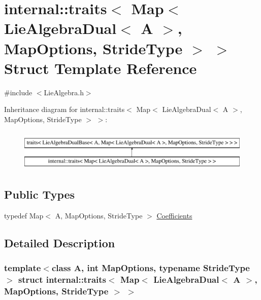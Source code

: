 \hypertarget{structinternal_1_1traits_3_01_map_3_01_lie_algebra_dual_3_01_a_01_4_00_01_map_options_00_01_stride_type_01_4_01_4}{}\section{internal\+:\+:traits$<$ Map$<$ Lie\+Algebra\+Dual$<$ A $>$, Map\+Options, Stride\+Type $>$ $>$ Struct Template Reference}
\label{structinternal_1_1traits_3_01_map_3_01_lie_algebra_dual_3_01_a_01_4_00_01_map_options_00_01_stride_type_01_4_01_4}


{\ttfamily \#include $<$Lie\+Algebra.\+h$>$}

Inheritance diagram for internal\+:\+:traits$<$ Map$<$ Lie\+Algebra\+Dual$<$ A $>$, Map\+Options, Stride\+Type $>$ $>$\+:\begin{figure}[H]
\begin{center}
\leavevmode
\includegraphics[height=2.000000cm]{structinternal_1_1traits_3_01_map_3_01_lie_algebra_dual_3_01_a_01_4_00_01_map_options_00_01_stride_type_01_4_01_4}
\end{center}
\end{figure}
\subsection*{Public Types}
\begin{DoxyCompactItemize}
\item 
typedef Map$<$ A, Map\+Options, Stride\+Type $>$ \hyperlink{structinternal_1_1traits_3_01_map_3_01_lie_algebra_dual_3_01_a_01_4_00_01_map_options_00_01_stride_type_01_4_01_4_ac32d899dac63614bee761abd9fd3241d}{Coefficients}
\end{DoxyCompactItemize}


\subsection{Detailed Description}
\subsubsection*{template$<$class A, int Map\+Options, typename Stride\+Type$>$\newline
struct internal\+::traits$<$ Map$<$ Lie\+Algebra\+Dual$<$ A $>$, Map\+Options, Stride\+Type $>$ $>$}



